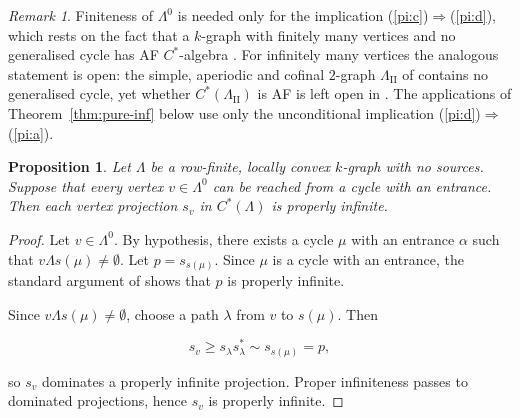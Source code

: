 \documentclass[12pt]{amsart}
\theoremstyle{plain}
\newtheorem{proposition}[theorem]{Proposition}
\theoremstyle{definition}
\theoremstyle{remark}
\newtheorem{remark}[theorem]{Remark}
\begin{document}
\begin{remark}\label{rem:pi-finite-vertices}
Finiteness of $\Lambda^0$ is needed only for the implication
\textup{(\ref{pi:c})}$\Rightarrow$\textup{(\ref{pi:d})}, which rests on the fact
that a $k$-graph with finitely many vertices and no generalised cycle has AF
$C^*$-algebra \cite[Proposition~5.4]{ES}. For infinitely many vertices the
analogous statement is open: the simple, aperiodic and cofinal $2$-graph
$\Lambda_{\mathrm{II}}$ of \cite[\S6]{ES} contains no generalised cycle, yet
whether $C^*(\Lambda_{\mathrm{II}})$ is AF is left open in
\cite[Remark~6.13]{ES}. The applications of Theorem~\ref{thm:pure-inf} below use
only the unconditional implication
\textup{(\ref{pi:d})}$\Rightarrow$\textup{(\ref{pi:a})}.
\end{remark}

\begin{proposition}\label{prop:properly-infinite-vertices}
Let \(\Lambda\) be a row-finite, locally convex \(k\)-graph with no sources.
Suppose that every vertex \(v\in\Lambda^0\) can be reached from a cycle
with an entrance. Then each vertex projection \(s_v\) in \(C^*(\Lambda)\)
is properly infinite.
\end{proposition}

\begin{proof}
Let \(v\in\Lambda^0\). By hypothesis, there exists a cycle \(\mu\) with an
entrance \(\alpha\) such that \(v\Lambda s(\mu)\neq\emptyset\). Let
\(p=s_{s(\mu)}\). Since \(\mu\) is a cycle with an entrance, the standard
argument of \cite[Proposition~2.7]{PSS4} shows that \(p\) is properly
infinite.

Since \(v\Lambda s(\mu)\neq\emptyset\), choose a path \(\lambda\) from \(v\) to
\(s(\mu)\). Then


\[
s_v \ge s_\lambda s_\lambda^* \sim s_{s(\mu)} = p,
\]


so \(s_v\) dominates a properly infinite projection. Proper infiniteness
passes to dominated projections, hence \(s_v\) is properly infinite.
\end{proof}
\end{document}
